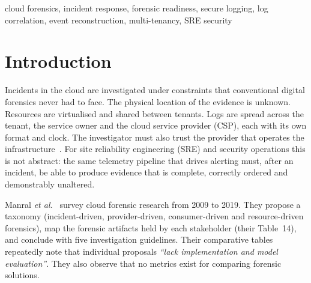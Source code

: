 \documentclass[conference,10pt]{IEEEtran}
\begin{document}
\begin{IEEEkeywords}
cloud forensics, incident response, forensic readiness, secure logging, log correlation, event reconstruction, multi-tenancy, SRE security
\end{IEEEkeywords}

\section{Introduction}
Incidents in the cloud are investigated under constraints that conventional digital forensics never had to face. The physical location of the evidence is unknown. Resources are virtualised and shared between tenants. Logs are spread across the tenant, the service owner and the cloud service provider (CSP), each with its own format and clock. The investigator must also trust the provider that operates the infrastructure~\cite{manral2019,pichan2015,nist8006}. For site reliability engineering (SRE) and security operations this is not abstract: the same telemetry pipeline that drives alerting must, after an incident, be able to produce evidence that is complete, correctly ordered and demonstrably unaltered.

Manral \textit{et al.}~\cite{manral2019} survey cloud forensic research from 2009 to 2019. They propose a taxonomy (incident-driven, provider-driven, consumer-driven and resource-driven forensics), map the forensic artifacts held by each stakeholder (their Table~14), and conclude with five investigation guidelines. Their comparative tables repeatedly note that individual proposals \emph{``lack implementation and model evaluation''}. They also observe that no metrics exist for comparing forensic solutions.
\end{document}
